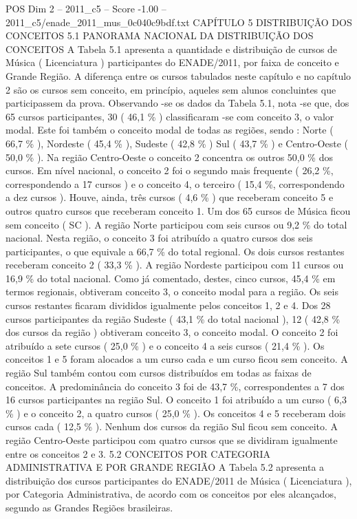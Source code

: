 \begin{textsample}{POS Dim 2 – 2011\_c5 – Score -1.00 – 2011\_c5/enade\_2011\_mus\_0c040c9bdf.txt}  \label{ex:f2_pos_353}
CAPÍTULO 5 DISTRIBUIÇÃO DOS CONCEITOS 5.1 PANORAMA NACIONAL DA DISTRIBUIÇÃO DOS CONCEITOS A Tabela 5.1 apresenta a quantidade e distribuição de cursos de Música ( Licenciatura ) participantes do ENADE/2011, por faixa de conceito e Grande Região.
A diferença entre os cursos tabulados neste capítulo e no capítulo 2 são os cursos sem conceito, em princípio, aqueles sem alunos concluintes que participassem da prova.
Observando -se os dados da Tabela 5.1, nota -se que, dos 65 cursos participantes, 30 ( 46,1 \% ) classificaram -se com conceito 3, o valor modal.
Este foi também o conceito modal de todas as regiões, sendo : Norte ( 66,7 \% ), Nordeste ( 45,4 \% ), Sudeste ( 42,8 \% ) Sul ( 43,7 \% ) e Centro-Oeste ( 50,0 \% ).
Na região Centro-Oeste o conceito 2 concentra os outros 50,0 \% dos cursos.
Em nível nacional, o conceito 2 foi o segundo mais frequente ( 26,2 \%, correspondendo a 17 cursos ) e o conceito 4, o terceiro ( 15,4 \%, correspondendo a dez cursos ).
Houve, ainda, três cursos ( 4,6 \% ) que receberam conceito 5 e outros quatro cursos que receberam conceito 1.
Um dos 65 cursos de Música ficou sem conceito ( SC ).
A região Norte participou com seis cursos ou 9,2 \% do total nacional.
Nesta região, o conceito 3 foi atribuído a quatro cursos dos seis participantes, o que equivale a 66,7 \% do total regional.
Os dois cursos restantes receberam conceito 2 ( 33,3 \% ).
A região Nordeste participou com 11 cursos ou 16,9 \% do total nacional.
Como já comentado, destes, cinco cursos, 45,4 \% em termos regionais, obtiveram conceito 3, o conceito modal para a região.
Os seis cursos restantes ficaram divididos igualmente pelos conceitos 1, 2 e 4.
Dos 28 cursos participantes da região Sudeste ( 43,1 \% do total nacional ), 12 ( 42,8 \% dos cursos da região ) obtiveram conceito 3, o conceito modal.
O conceito 2 foi atribuído a sete cursos ( 25,0 \% ) e o conceito 4 a seis cursos ( 21,4 \% ).
Os conceitos 1 e 5 foram alocados a um curso cada e um curso ficou sem conceito.
A região Sul também contou com cursos distribuídos em todas as faixas de conceitos.
A predominância do conceito 3 foi de 43,7 \%, correspondentes a 7 dos 16 cursos participantes na região Sul.
O conceito 1 foi atribuído a um curso ( 6,3 \% ) e o conceito 2, a quatro cursos ( 25,0 \% ).
Os conceitos 4 e 5 receberam dois cursos cada ( 12,5 \% ).
Nenhum dos cursos da região Sul ficou sem conceito.
A região Centro-Oeste participou com quatro cursos que se dividiram igualmente entre os conceitos 2 e 3. 5.2 CONCEITOS POR CATEGORIA ADMINISTRATIVA E POR GRANDE REGIÃO A Tabela 5.2 apresenta a distribuição dos cursos participantes do ENADE/2011 de Música ( Licenciatura ), por Categoria Administrativa, de acordo com os conceitos por eles alcançados, segundo as Grandes Regiões brasileiras.

\end{textsample}
